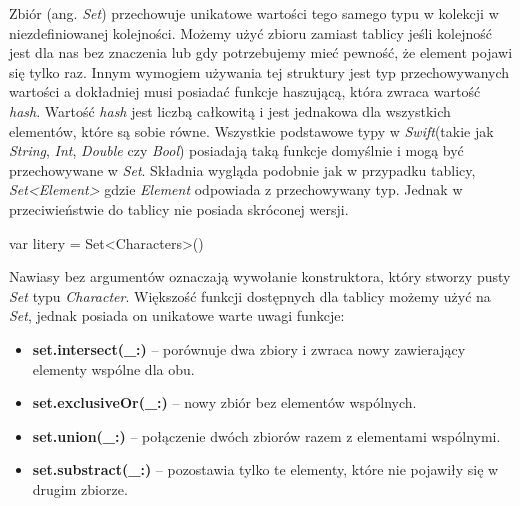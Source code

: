 \documentclass{iiuwb}
\begin{document}
Zbiór (ang. \textit{Set}) przechowuje unikatowe wartości tego samego typu w kolekcji w niezdefiniowanej kolejności. Możemy użyć zbioru zamiast tablicy jeśli kolejność jest dla nas bez znaczenia lub gdy potrzebujemy mieć pewność, że element pojawi się tylko raz. Innym wymogiem używania tej struktury jest typ przechowywanych wartości a dokładniej musi posiadać funkcje haszującą, która zwraca wartość \textit{hash}. Wartość \textit{hash} jest liczbą całkowitą i jest jednakowa dla wszystkich elementów, które są sobie równe. Wszystkie podstawowe typy w \textit{Swift}(takie jak \textit{String},  \textit{Int},  \textit{Double} czy \textit{Bool}) posiadają taką funkcje domyślnie i mogą być przechowywane w \textit{Set}. Składnia wygląda podobnie jak w przypadku tablicy, \textit{Set<Element>} gdzie \textit{Element} odpowiada z przechowywany typ. Jednak w przeciwieństwie do tablicy nie posiada skróconej wersji. 
\begin{center}
	var litery = Set<Characters>()
\end{center}
Nawiasy bez argumentów oznaczają wywołanie konstruktora, który stworzy pusty \textit{Set} typu \textit{Character}. Większość funkcji dostępnych dla tablicy możemy użyć na \textit{Set}, jednak posiada on unikatowe warte uwagi funkcje:
\begin{itemize}
\item \textbf{set.intersect(\_:)} -- porównuje dwa zbiory i zwraca nowy zawierający elementy wspólne dla obu.
\item \textbf{set.exclusiveOr(\_:)} -- nowy zbiór bez elementów wspólnych.
\item \textbf{set.union(\_:)} -- połączenie dwóch zbiorów razem z elementami wspólnymi.
\item \textbf{set.substract(\_:)} -- pozostawia tylko te elementy, które nie pojawiły się w drugim zbiorze.
\end{itemize}
\end{document}
